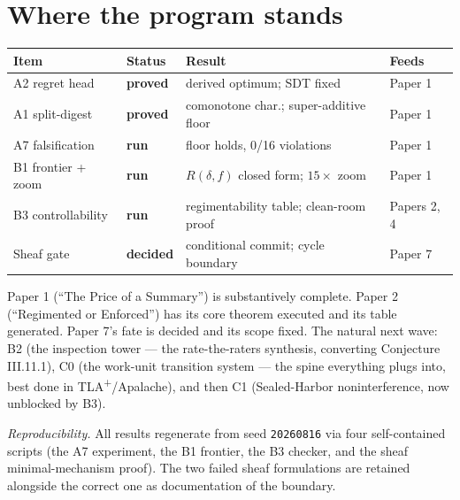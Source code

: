 \documentclass[11pt,a4paper]{article}
\begin{document}
\section{Where the program stands}
\begin{center}
\begin{tabular}{@{}llll@{}}
\toprule
Item & Status & Result & Feeds \\
\midrule
A2 regret head & \textbf{proved} & derived optimum; SDT fixed & Paper 1 \\
A1 split-digest & \textbf{proved} & comonotone char.; super-additive floor & Paper 1 \\
A7 falsification & \textbf{run} & floor holds, 0/16 violations & Paper 1 \\
B1 frontier + zoom & \textbf{run} & $R(\delta,f)$ closed form; $15\times$ zoom & Paper 1 \\
B3 controllability & \textbf{run} & regimentability table; clean-room proof & Papers 2, 4 \\
Sheaf gate & \textbf{decided} & conditional commit; cycle boundary & Paper 7 \\
\bottomrule
\end{tabular}
\end{center}
Paper 1 (``The Price of a Summary'') is substantively complete. Paper 2 (``Regimented or Enforced'') has its core theorem executed and its table generated. Paper 7's fate is decided and its scope fixed. The natural next wave: B2 (the inspection tower --- the rate-the-raters synthesis, converting Conjecture III.11.1), C0 (the work-unit transition system --- the spine everything plugs into, best done in TLA\textsuperscript{+}/Apalache), and then C1 (Sealed-Harbor noninterference, now unblocked by B3).

\vspace{0.4em}
\noindent\emph{Reproducibility.} All results regenerate from seed \texttt{20260816} via four self-contained scripts (the A7 experiment, the B1 frontier, the B3 checker, and the sheaf minimal-mechanism proof). The two failed sheaf formulations are retained alongside the correct one as documentation of the boundary.
\end{document}
